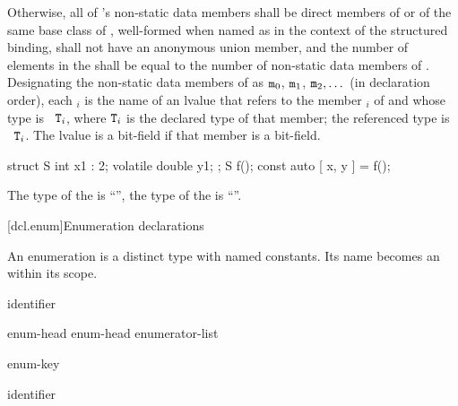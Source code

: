 \pnum
Otherwise,
all of 's non-static data members
shall be direct members of  or
of the same base class of ,
well-formed when named as 
in the context of the structured binding,
 shall not have an anonymous union member, and
the number of elements in the  shall be
equal to the number of non-static data members of .
Designating the non-static data members of  as
$\texttt{m}_0$, $\texttt{m}_1$, $\texttt{m}_2, \dotsc$
(in declaration order),
each $_i$ is the
name of an lvalue that refers to the member $_i$ of  and
whose type is \cv{}~$\texttt{T}_i$, where $\texttt{T}_i$ is the declared type of
that member; the referenced type is \cv{}~$\texttt{T}_i$. The lvalue is a
bit-field if that member is a bit-field.
\begin{example}
\begin{codeblock}
struct S { int x1 : 2; volatile double y1; };
S f();
const auto [ x, y ] = f();
\end{codeblock}
The type of the   is ``'',
the type of the   is ``''.
\end{example}

[dcl.enum]{Enumeration declarations}%
%
%

\pnum
An enumeration is a distinct type with named
constants. Its name becomes an  within its scope.

\begin{bnf}
\br
    identifier
\end{bnf}

\begin{bnf}
\br
    enum-head \terminal{\{}  \terminal{\}}\br
    enum-head \terminal{\{} enumerator-list \terminal{, \}}
\end{bnf}

\begin{bnf}
\br
    enum-key   
\end{bnf}

\begin{bnf}
\br
     identifier
\end{bnf}

